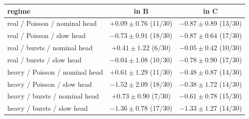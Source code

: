 \begin{tabular}{@{}lcc@{}}
\toprule
regime & in B & in C \\
\midrule
real / Poisson / nominal head & $+0.09 \pm 0.76$ (11/30) & $-0.87 \pm 0.89$ (13/30) \\
real / Poisson / slow head & $-0.73 \pm 0.91$ (18/30) & {\boldmath$-0.87 \pm 0.64$} (17/30) \\
real / bursts / nominal head & $+0.41 \pm 1.22$ (6/30) & $-0.05 \pm 0.42$ (10/30) \\
real / bursts / slow head & $-0.04 \pm 1.08$ (10/30) & $-0.78 \pm 0.90$ (17/30) \\
heavy / Poisson / nominal head & $+0.61 \pm 1.29$ (11/30) & $-0.48 \pm 0.87$ (14/30) \\
heavy / Poisson / slow head & $-1.52 \pm 2.09$ (18/30) & $-0.38 \pm 1.72$ (14/30) \\
heavy / bursts / nominal head & $+0.73 \pm 0.90$ (7/30) & $-0.61 \pm 0.78$ (15/30) \\
heavy / bursts / slow head & {\boldmath$-1.36 \pm 0.78$} (17/30) & {\boldmath$-1.33 \pm 1.27$} (14/30) \\
\bottomrule
\end{tabular}
